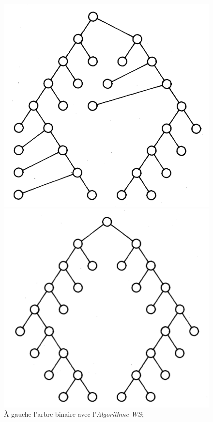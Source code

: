 \documentclass{article}
\begin{document}
  \vfill
  \begin{figure}[h]
      \begin{center}
        \begin{left}
          \includegraphics[scale=0.4]{arbreWSM.png}
        \end{left}
        \begin{right}
          \includegraphics[scale=0.4]{arbreMirror.png}
        \end{right}
      \end{center}
    \caption{À gauche l'arbre binaire avec l'\emph{Algorithme WS};  \cite{article81}}
    \label{fig:arbresWSMirror}
  \end{figure}
  \vfill
\end{document}
